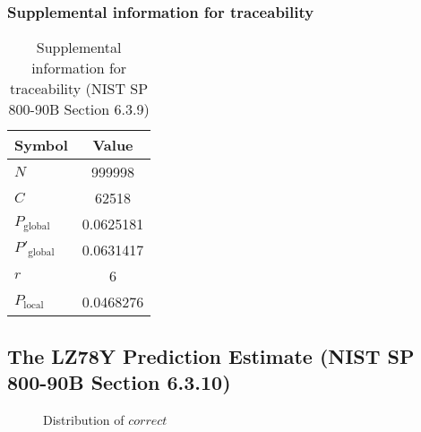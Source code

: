 \documentclass[a3paper,xelatex,english]{bxjsarticle}
\begin{document}
\subsubsection{Supplemental information for traceability}
\renewcommand{\arraystretch}{1.8}
\begin{table}[h]
\caption{Supplemental information for traceability (NIST SP 800-90B Section 6.3.9)}
\begin{center}
\begin{tabular}{|l|c|}
\hline 
\rowcolor{anotherlightblue} %
Symbol				& Value \\ \hline 
$N$				& 999998\\ \hline 
$C$				& 62518\\ \hline 
$P_{\textrm{global}}$				& 0.0625181\\ \hline 
$P'_{\textrm{global}}$			& 0.0631417\\ \hline 
$r$				& 6\\ \hline 
$P_{\textrm{local}}$ 			& 0.0468276\\ \hline
\end{tabular}
\end{center}
\end{table}
\renewcommand{\arraystretch}{1.4}
\clearpage
\subsection{The LZ78Y Prediction Estimate (NIST SP 800-90B Section 6.3.10)}
\begin{figure}[htbp]
\caption{Distribution of $correct$}
\end{figure}
\end{document}
